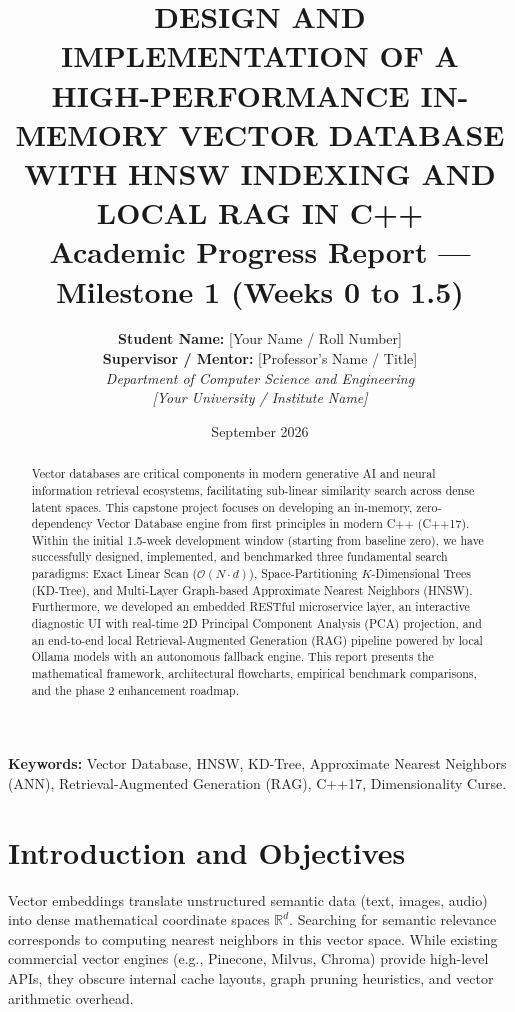 \documentclass[11pt,a4paper]{article}
\title{
    \vspace{-1.5cm}
    \textbf{\Large DESIGN AND IMPLEMENTATION OF A HIGH-PERFORMANCE IN-MEMORY VECTOR DATABASE WITH HNSW INDEXING AND LOCAL RAG IN C++} \\[0.3cm]
    \large Academic Progress Report --- Milestone 1 (Weeks 0 to 1.5)
}
\author{
    \textbf{Student Name:} [Your Name / Roll Number] \\
    \textbf{Supervisor / Mentor:} [Professor's Name / Title] \\[0.15cm]
    \textit{Department of Computer Science and Engineering} \\
    \textit{[Your University / Institute Name]}
}
\date{September 2026}
\begin{document}
\maketitle
\thispagestyle{fancy}

\begin{abstract}
Vector databases are critical components in modern generative AI and neural information retrieval ecosystems, facilitating sub-linear similarity search across dense latent spaces. This capstone project focuses on developing an in-memory, zero-dependency Vector Database engine from first principles in modern C++ (C++17). Within the initial 1.5-week development window (starting from baseline zero), we have successfully designed, implemented, and benchmarked three fundamental search paradigms: Exact Linear Scan ($\mathcal{O}(N \cdot d)$), Space-Partitioning $K$-Dimensional Trees (KD-Tree), and Multi-Layer Graph-based Approximate Nearest Neighbors (HNSW). Furthermore, we developed an embedded RESTful microservice layer, an interactive diagnostic UI with real-time 2D Principal Component Analysis (PCA) projection, and an end-to-end local Retrieval-Augmented Generation (RAG) pipeline powered by local Ollama models with an autonomous fallback engine. This report presents the mathematical framework, architectural flowcharts, empirical benchmark comparisons, and the phase 2 enhancement roadmap.
\end{abstract}

\vspace{0.2cm}
\noindent\textbf{Keywords:} Vector Database, HNSW, KD-Tree, Approximate Nearest Neighbors (ANN), Retrieval-Augmented Generation (RAG), C++17, Dimensionality Curse.

\section{Introduction and Objectives}
Vector embeddings translate unstructured semantic data (text, images, audio) into dense mathematical coordinate spaces $\mathbb{R}^d$. Searching for semantic relevance corresponds to computing nearest neighbors in this vector space. While existing commercial vector engines (e.g., Pinecone, Milvus, Chroma) provide high-level APIs, they obscure internal cache layouts, graph pruning heuristics, and vector arithmetic overhead.
\end{document}
